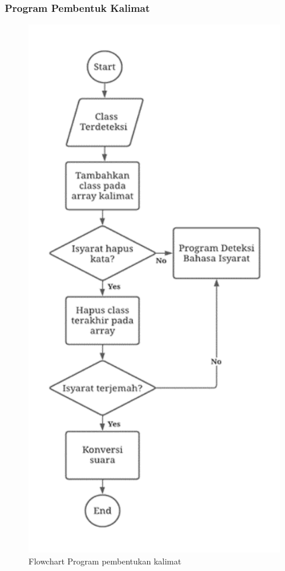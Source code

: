 \subsubsection{Program Pembentuk Kalimat}
\begin{figure}[H]
  \centering

  \includegraphics[scale=0.54]{gambar/bab3-flowchart-kalimat.png}

  \caption{Flowchart Program pembentukan kalimat}
  \label{fig:flowchartkalimat}
\end{figure}

